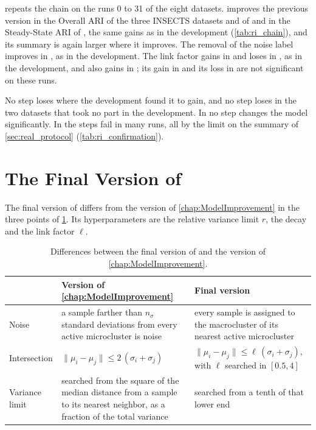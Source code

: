 

 repeats the chain on the runs 0 to 31 of the eight datasets.  improves the previous \MicroTEDAClusPlus version in the Overall ARI of the three INSECTS datasets and of \Pendigits and in the Steady-State ARI of \Pendigits, the same gains as in the development (\cref{tab:ri_chain}), and its summary is again larger where it improves. The removal of the noise label improves  in \InsectsReoccurring, as in the development. The link factor gains in \Pendigits and loses in \InsectsReoccurring, as in the development, and also gains in \Covertype; its gain in \GasDrift and its loss in \InsectsIncremental are not significant on these runs.

No step loses where the development found it to gain, and no step loses in the two datasets that took no part in the development. In \KDDCup no step changes the model significantly. In \Covertype the steps fail in many runs, all by the limit on the summary of \cref{sec:real_protocol} (\cref{tab:ri_confirmation}).

\section{The Final Version of \MicroTEDAClusPlus}
\label{sec:ri_final}

The final version of \MicroTEDAClusPlus differs from the version of \cref{chap:ModelImprovement} in the three points of \cref{tab:ri_differences}. Its hyperparameters are the relative variance limit $r$, the decay and the link factor $\ell$.

\begin{table}[htbp]
\centering
\caption[Differences between the two versions of \MicroTEDAClusPlus]{Differences between the final version of \MicroTEDAClusPlus and the version of \cref{chap:ModelImprovement}.}
\begin{tabular}{l p{} p{}}
\toprule
 & Version of \cref{chap:ModelImprovement} & Final version \\
\midrule
Noise & a sample farther than $n_\sigma$ standard deviations from every active microcluster is noise & every sample is assigned to the macrocluster of its nearest active microcluster \\
Intersection & $\lVert \mu_i - \mu_j \rVert \le 2\,(\sigma_i + \sigma_j)$ & $\lVert \mu_i - \mu_j \rVert \le \ell\,(\sigma_i + \sigma_j)$, with $\ell$ searched in $[0.5, 4]$ \\
Variance limit & searched from the square of the median distance from a sample to its nearest neighbor, as a fraction of the total variance & searched from a tenth of that lower end \\
\bottomrule
\end{tabular}
\label{tab:ri_differences}
\end{table}

